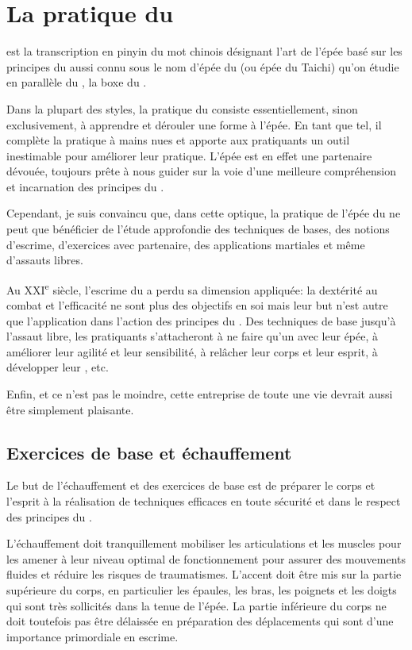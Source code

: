 \chapter{La pratique du \Taijijian{}}

\Taijijian{} est la transcription en pinyin du mot chinois désignant l'art de l'épée basé sur les principes du  \Taiji{} \textendash{} aussi connu sous le nom d'épée du \Taiji{} (ou épée du Taichi) \textendash{}  qu'on étudie en parallèle du \Taijiquan{}, la boxe du \Taiji{}.

Dans la plupart des styles, la pratique du \Taijijian{} consiste essentiellement, sinon exclusivement, à apprendre et dérouler une forme à l'épée. En tant que tel, il complète la pratique à mains nues et apporte aux pratiquants un outil inestimable pour améliorer leur pratique.
L'épée est en effet une partenaire dévouée, toujours prête à nous guider sur la voie d'une meilleure compréhension et incarnation des principes du \Taiji{}.

Cependant, je suis convaincu que, dans cette optique, la pratique de l'épée du \Taiji{} ne peut que bénéficier de l'étude approfondie des techniques de bases, des notions d'escrime, d'exercices avec partenaire, des applications martiales et même d'assauts libres.

Au XXI\textsuperscript{e} siècle, l'escrime du \Taiji{} a perdu sa dimension appliquée: la dextérité au combat et l'efficacité ne sont plus des objectifs en soi mais leur but n'est autre que l'application dans l'action des principes du \Taiji{}.
Des techniques de base jusqu'à l'assaut libre, les pratiquants s'attacheront à ne faire qu'un avec leur épée, à améliorer leur agilité et leur sensibilité, à relâcher leur corps et leur esprit, à développer leur \Yi{}, etc.

Enfin, et ce n'est pas le moindre, cette entreprise de toute une vie devrait aussi être simplement plaisante.

\section{Exercices de base et échauffement}
Le but de l'échauffement et des exercices de base est de préparer le corps et l'esprit à la réalisation de techniques efficaces en toute sécurité et dans le respect des principes du \Taiji{}.

L'échauffement doit tranquillement mobiliser les articulations et les muscles pour les amener à leur niveau optimal de fonctionnement pour assurer des mouvements fluides et réduire les risques de traumatismes.
L'accent doit être mis sur la partie supérieure du corps, en particulier les épaules, les bras, les poignets et les doigts qui sont très sollicités dans la tenue de l'épée.
La partie inférieure du corps ne doit toutefois pas être délaissée en préparation des déplacements qui sont d'une importance primordiale en escrime.

